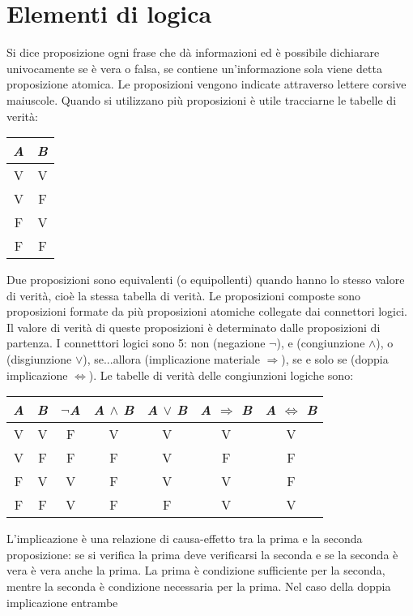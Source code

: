 \chapter{Elementi di logica}
Si dice proposizione ogni frase che d\`a informazioni ed \`e possibile dichiarare univocamente se \`e vera o falsa, se contiene un'informazione sola viene detta proposizione
atomica. Le proposizioni vengono indicate attraverso lettere corsive maiuscole. Quando si utilizzano pi\`u proposizioni \`e utile tracciarne le tabelle di verit\`a:
\begin{center}
\begin{tabular}{|c|c|}
\hline
\textit{A} & \textit{B} \\
\hline
V & V \\
V & F \\
F & V \\
F & F \\
\hline
\end{tabular}
\end{center}
Due proposizioni sono equivalenti (o equipollenti) quando hanno lo stesso valore di verit\`a, cio\`e la stessa tabella di verit\`a. Le proposizioni composte sono proposizioni 
formate da pi\`u proposizioni atomiche collegate dai connettori logici. Il valore di verit\`a di queste proposizioni \`e determinato dalle proposizioni di partenza. I 
connetttori logici sono 5: non (negazione $\neg$), e (congiunzione $\wedge$), o (disgiunzione $\lor$), se...allora (implicazione materiale $\Rightarrow$), se e solo se (doppia implicazione $\Leftrightarrow$). Le tabelle di verit\`a delle congiunzioni logiche sono:
\begin{center}
\begin{tabular}{|c|c|c|c|c|c|c|}
\hline
\textit{A} & \textit{B} & $\neg$\textit{A} & \textit{A} $\wedge$ \textit{B} & \textit{A} $\lor$ \textit{B} & \textit{A} $\Rightarrow$ \textit{B} & \textit{A} $\Leftrightarrow$ \textit{B}\\
\hline
V & V & F & V & V & V & V\\
V & F & F & F & V & F & F\\
F & V & V & F & V & V & F\\
F & F & V & F & F & V & V\\
\hline
\end{tabular}
\end{center}
L'implicazione \`e una relazione di causa-effetto tra la prima e la seconda proposizione: se si verifica la prima deve verificarsi la seconda e se la seconda \`e vera \`e 
vera anche la prima. La prima \`e condizione sufficiente per la seconda, mentre la seconda \`e condizione necessaria per la prima. Nel caso della doppia implicazione entrambe 
